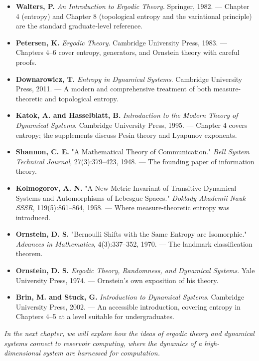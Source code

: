 \begin{itemize}[nosep]
  \item \textbf{Walters, P.} \textit{An Introduction to Ergodic Theory}. Springer, 1982. --- Chapter 4 (entropy) and Chapter 8 (topological entropy and the variational principle) are the standard graduate-level reference.

  \item \textbf{Petersen, K.} \textit{Ergodic Theory}. Cambridge University Press, 1983. --- Chapters 4--6 cover entropy, generators, and Ornstein theory with careful proofs.

  \item \textbf{Downarowicz, T.} \textit{Entropy in Dynamical Systems}. Cambridge University Press, 2011. --- A modern and comprehensive treatment of both measure-theoretic and topological entropy.

  \item \textbf{Katok, A. and Hasselblatt, B.} \textit{Introduction to the Modern Theory of Dynamical Systems}. Cambridge University Press, 1995. --- Chapter 4 covers entropy; the supplements discuss Pesin theory and Lyapunov exponents.

  \item \textbf{Shannon, C. E.} "A Mathematical Theory of Communication." \textit{Bell System Technical Journal}, 27(3):379--423, 1948. --- The founding paper of information theory.

  \item \textbf{Kolmogorov, A. N.} "A New Metric Invariant of Transitive Dynamical Systems and Automorphisms of Lebesgue Spaces." \textit{Doklady Akademii Nauk SSSR}, 119(5):861--864, 1958. --- Where measure-theoretic entropy was introduced.

  \item \textbf{Ornstein, D. S.} "Bernoulli Shifts with the Same Entropy are Isomorphic." \textit{Advances in Mathematics}, 4(3):337--352, 1970. --- The landmark classification theorem.

  \item \textbf{Ornstein, D. S.} \textit{Ergodic Theory, Randomness, and Dynamical Systems}. Yale University Press, 1974. --- Ornstein's own exposition of his theory.

  \item \textbf{Brin, M. and Stuck, G.} \textit{Introduction to Dynamical Systems}. Cambridge University Press, 2002. --- An accessible introduction, covering entropy in Chapters 4--5 at a level suitable for undergraduates.


\bigskip

\end{itemize}

\textit{In the next chapter, we will explore how the ideas of ergodic theory and dynamical systems connect to reservoir computing, where the dynamics of a high-dimensional system are harnessed for computation.}
